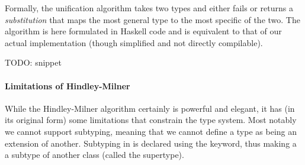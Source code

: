 Formally, the unification algorithm takes two types and either fails or returns a \emph{substitution} that maps the most general type to the most specific of the two. The algorithm is here formulated in Haskell code and is equivalent to that of our actual implementation (though simplified and not directly compilable).

TODO: snippet









\paragraph{Limitations of Hindley-Milner}
While the Hindley-Milner algorithm certainly is powerful and elegant, it has (in its original form) some limitations that constrain the type system. Most notably we cannot support subtyping, meaning that we cannot define a type as being an extension of another. Subtyping in  is declared using the  keyword, thus making a  a subtype of another class (called the supertype).

